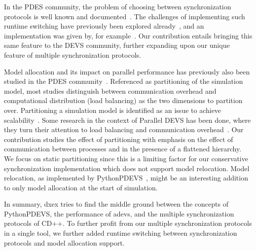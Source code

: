 In the PDES community, the problem of choosing between synchronization protocols is well known and documented~\cite{Jha:1994:UFC:195291.182480}.
The challenges of implementing such runtime switching have previously been explored already~\cite{Das:1996:APP:256562.256602}, and an implementation was given by, for example~\cite{perumalla2005musik}.
Our contribution entails bringing this same feature to the DEVS community, further expanding upon our unique feature of multiple synchronization protocols.

Model allocation and its impact on parallel performance has previously also been studied in the PDES community~\cite{PDESpartitioning}.
Referenced as partitioning of the simulation model, most studies distinguish between communication overhead and computational distribution (load balancing) as the two dimensions to partition over.
Partitioning a simulation model is identified as an issue to achieve scalability~\cite{Scalability}. 
Some research in the context of Parallel DEVS has been done, where they turn their attention to load balancing and communication overhead~\cite{PDEVSpartitioning}.
Our contribution studies the effect of partitioning with emphasis on the effect of communication between processes and in the presence of a flattened hierarchy. 
We focus on static partitioning since this is a limiting factor for our conservative synchronization implementation which does not support model relocation.
Model relocation, as implemented by PythonPDEVS~\cite{PythonPDEVS2}, might be an interesting addition to only model allocation at the start of simulation.

In summary, dxex tries to find the middle ground between the concepts of PythonPDEVS, the performance of adevs, and the multiple synchronization protocols of CD++.
To further profit from our multiple synchronization protocols in a single tool, we further added runtime switching between synchronization protocols and model allocation support.
